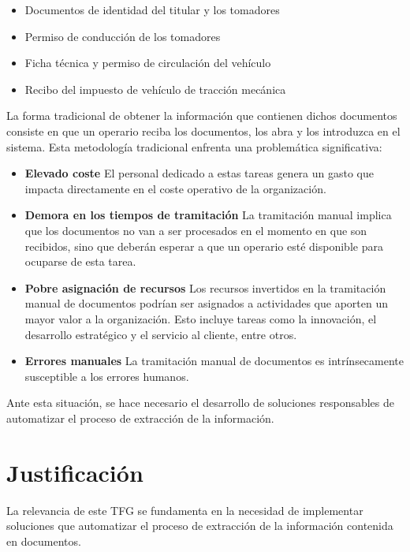 \begin{itemize}
    \item Documentos de identidad del titular y los tomadores
    \item Permiso de conducción de los tomadores
    \item Ficha técnica y permiso de circulación del vehículo
    \item Recibo del impuesto de vehículo de tracción mecánica
\end{itemize}

La forma tradicional de obtener la información que contienen dichos documentos consiste en que un operario reciba los
documentos, los abra y los introduzca en el sistema.
Esta metodología tradicional enfrenta una problemática significativa:

\begin{itemize}
    \item \textbf{Elevado coste}
    El personal dedicado a estas tareas genera un gasto que impacta directamente en el coste operativo de la
    organización.
    \item \textbf{Demora en los tiempos de tramitación}
    La tramitación manual implica que los documentos no van a ser procesados en el momento en que son recibidos, sino
    que deberán esperar a que un operario esté disponible para ocuparse de esta tarea.
    \item \textbf{Pobre asignación de recursos}
    Los recursos invertidos en la tramitación manual de documentos podrían ser asignados a actividades que aporten un
    mayor valor a la organización.
    Esto incluye tareas como la innovación, el desarrollo estratégico y el servicio al cliente, entre otros.
    \item \textbf{Errores manuales}
    La tramitación manual de documentos es intrínsecamente susceptible a los errores humanos.
\end{itemize}

Ante esta situación, se hace necesario el desarrollo de soluciones responsables de automatizar el proceso de extracción
de la información.


\section{Justificación}

La relevancia de este TFG se fundamenta en la necesidad de implementar soluciones que automatizar el proceso de
extracción de la información contenida en documentos.

